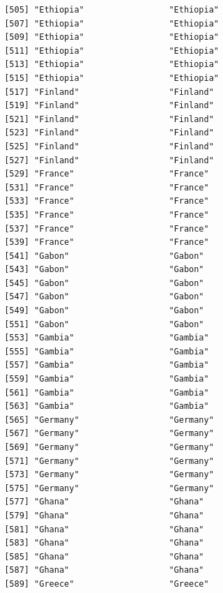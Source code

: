\documentclass[
  letterpaper,
  DIV=11,
  numbers=noendperiod]{scrreprt}
\begin{document}
\begin{verbatim}
 [505] "Ethiopia"                 "Ethiopia"                
 [507] "Ethiopia"                 "Ethiopia"                
 [509] "Ethiopia"                 "Ethiopia"                
 [511] "Ethiopia"                 "Ethiopia"                
 [513] "Ethiopia"                 "Ethiopia"                
 [515] "Ethiopia"                 "Ethiopia"                
 [517] "Finland"                  "Finland"                 
 [519] "Finland"                  "Finland"                 
 [521] "Finland"                  "Finland"                 
 [523] "Finland"                  "Finland"                 
 [525] "Finland"                  "Finland"                 
 [527] "Finland"                  "Finland"                 
 [529] "France"                   "France"                  
 [531] "France"                   "France"                  
 [533] "France"                   "France"                  
 [535] "France"                   "France"                  
 [537] "France"                   "France"                  
 [539] "France"                   "France"                  
 [541] "Gabon"                    "Gabon"                   
 [543] "Gabon"                    "Gabon"                   
 [545] "Gabon"                    "Gabon"                   
 [547] "Gabon"                    "Gabon"                   
 [549] "Gabon"                    "Gabon"                   
 [551] "Gabon"                    "Gabon"                   
 [553] "Gambia"                   "Gambia"                  
 [555] "Gambia"                   "Gambia"                  
 [557] "Gambia"                   "Gambia"                  
 [559] "Gambia"                   "Gambia"                  
 [561] "Gambia"                   "Gambia"                  
 [563] "Gambia"                   "Gambia"                  
 [565] "Germany"                  "Germany"                 
 [567] "Germany"                  "Germany"                 
 [569] "Germany"                  "Germany"                 
 [571] "Germany"                  "Germany"                 
 [573] "Germany"                  "Germany"                 
 [575] "Germany"                  "Germany"                 
 [577] "Ghana"                    "Ghana"                   
 [579] "Ghana"                    "Ghana"                   
 [581] "Ghana"                    "Ghana"                   
 [583] "Ghana"                    "Ghana"                   
 [585] "Ghana"                    "Ghana"                   
 [587] "Ghana"                    "Ghana"                   
 [589] "Greece"                   "Greece"                  

\end{verbatim}
\end{document}
